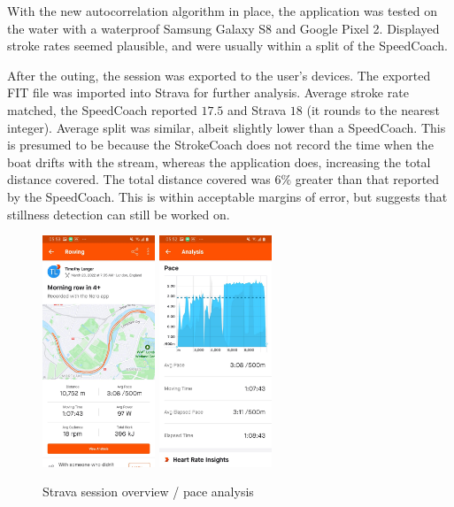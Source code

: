 \documentclass[11pt,twoside,a4paper]{report}
\begin{document}
With the new autocorrelation algorithm in place, the application was tested on the water with a waterproof Samsung Galaxy S8 and Google Pixel 2. Displayed stroke rates seemed plausible, and were usually within a split of the SpeedCoach.

After the outing, the session was exported to the user's devices. The exported FIT file was imported into Strava for further analysis. Average stroke rate matched, the SpeedCoach reported $17.5$ and Strava $18$ (it rounds to the nearest integer). Average split was similar, albeit slightly lower than a SpeedCoach. This is presumed to be because the StrokeCoach does not record the time when the boat drifts with the stream, whereas the application does, increasing the total distance covered. The total distance covered was $6\%$ greater than that reported by the SpeedCoach. This is within acceptable margins of error, but suggests that stillness detection can still be worked on.

\begin{figure}[h!]
  \centering
  \includegraphics[width=0.3\textwidth]{strava.jpg}
  \includegraphics[width=0.3\textwidth]{stravapace.jpg}
  \caption{Strava session overview / pace analysis}
  \label{fig:stravathing}
\end{figure}
\end{document}
